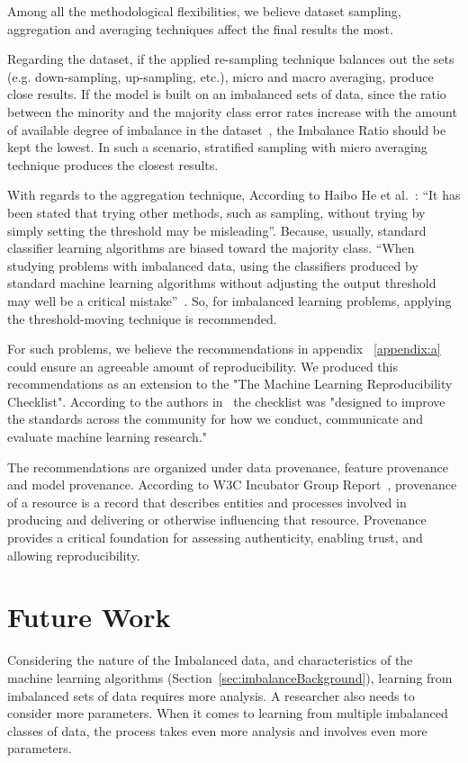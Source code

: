 Among all the methodological flexibilities, we believe dataset sampling, aggregation and 
averaging techniques affect the final results the most.

Regarding the dataset, if the applied re-sampling technique balances out the sets 
(e.g. down-sampling, up-sampling, etc.), micro and macro averaging, produce close results. 
If the model is built on an imbalanced sets of data, since the ratio between the minority and the 
majority class error rates increase with the amount of available degree of imbalance 
in the dataset~\cite{japkowicz_concept-learning_2001}, the Imbalance Ratio should be kept the lowest. 
In such a scenario, stratified sampling with micro averaging technique produces the closest results. 

With regards to the aggregation technique, According to Haibo He et al.~\cite{haibo_he_learning_2009}: 
“It has been stated that trying other methods, such as sampling, without trying by simply setting the 
threshold may be misleading”. Because, usually, standard classifier learning algorithms are 
biased toward the majority class. “When studying problems with imbalanced data, using the 
classifiers produced by standard machine learning algorithms without adjusting the output 
threshold may well be a critical mistake”~\cite{provost_machine_2000}. So, for imbalanced 
learning problems, applying the threshold-moving technique is recommended. 

For such problems, we believe the recommendations in appendix ~\ref{appendix:a} could ensure 
an agreeable amount of reproducibility. We produced this recommendations as an extension to 
the "The Machine Learning Reproducibility Checklist". According to the authors 
in~\cite{pineau_improving_2020} the checklist was "designed to improve the 
standards across the community for how we conduct, communicate and evaluate machine 
learning research."

The recommendations are organized under data provenance, feature provenance and 
model provenance. According to W3C Incubator Group Report~\cite{w3c}, 
provenance of a resource is a record that describes entities and processes involved in producing 
and delivering or otherwise influencing that resource. Provenance provides a critical foundation 
for assessing authenticity, enabling trust, and allowing reproducibility. 

\section{Future Work}
Considering the nature of the Imbalanced data, and characteristics of the machine learning 
algorithms (Section~\ref{sec:imbalanceBackground}), learning from imbalanced sets of data 
requires more analysis. A researcher also needs to consider more parameters. When it comes 
to learning from multiple imbalanced classes of data, the process takes even more analysis 
and involves even more parameters. 

